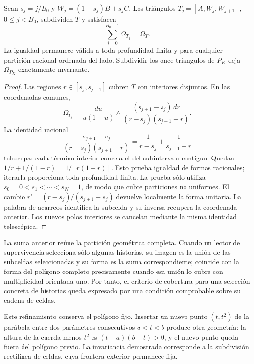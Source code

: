 \begin{theorem}
\label{thm:polygon-carry}
Sean \(s_j=j/B_0\) y \(W_j=(1-s_j)B+s_jC\).
Los triángulos \(T_j=[A,W_j,W_{j+1}]\), \(0\leq j<B_0\), subdividen
\(T\) y satisfacen
\begin{equation}
 \sum_{j=0}^{B_0-1}\Omega_{T_j}=\Omega_T.
 \label{eq:polygon-carry-additivity}
\end{equation}
La igualdad permanece válida a toda profundidad finita y para cualquier
partición racional ordenada del lado. Subdividir los once triángulos
de \(P_K\) deja \(\Omega_{P_K}\) exactamente invariante.
\end{theorem}
\begin{proof}
Las regiones \(r\in[s_j,s_{j+1}]\) cubren \(T\) con interiores disjuntos.
En las coordenadas comunes,
\[
 \Omega_{T_j}=\frac{du}{u(1-u)}\wedge
 \frac{(s_{j+1}-s_j)\,dr}{(r-s_j)(s_{j+1}-r)}.
\]
La identidad racional
\[
 \frac{s_{j+1}-s_j}{(r-s_j)(s_{j+1}-r)}
 =\frac1{r-s_j}+\frac1{s_{j+1}-r}
\]
telescopa: cada término interior cancela el del subintervalo contiguo.
Quedan \(1/r+1/(1-r)=1/[r(1-r)]\). Esto prueba igualdad de formas
racionales; iterarla proporciona toda profundidad finita.
La prueba sólo utiliza \(s_0=0<s_1<\cdots<s_N=1\), de modo que cubre
particiones no uniformes. El cambio
\(r'=(r-s_j)/(s_{j+1}-s_j)\) devuelve localmente la forma unitaria.
La palabra de acarreos identifica la subcelda y su inversa recupera la
coordenada anterior. Los nuevos polos interiores se cancelan mediante
la misma identidad telescópica.
\end{proof}

La suma anterior reúne la partición geométrica completa. Cuando un lector
de supervivencia selecciona sólo algunas historias, su imagen es la unión
de las subceldas seleccionadas y su forma es la suma correspondiente;
coincide con la forma del polígono completo precisamente cuando esa unión
lo cubre con multiplicidad orientada uno. Por tanto, el criterio de
cobertura para una selección concreta de historias queda expresado por
una condición comprobable sobre su cadena de celdas.

Este refinamiento conserva el polígono fijo. Insertar un nuevo punto
\((t,t^2)\) de la parábola entre dos parámetros consecutivos \(a<t<b\)
produce otra geometría: la altura de la cuerda menos \(t^2\) es
\((t-a)(b-t)>0\), y el nuevo punto queda fuera del polígono previo.
La invariancia demostrada corresponde a la subdivisión rectilínea de
celdas, cuya frontera exterior permanece fija.

